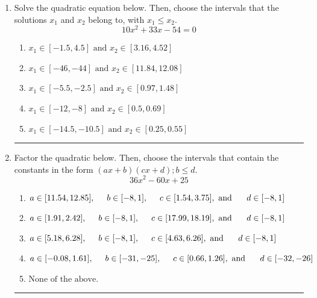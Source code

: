 \documentclass[14pt]{extbook}
\newcommand{\litem}[1]{\item#1\hspace*{-1cm}\rule{\textwidth}{0.4pt}}
\begin{document}
\begin{enumerate}
{\begin{enumerate}[label=\Alph*.]
\end{enumerate} }
\litem{
Solve the quadratic equation below. Then, choose the intervals that the solutions $x_1$ and $x_2$ belong to, with $x_1 \leq x_2$.\[ 10x^{2} +33 x -54 = 0 \]\begin{enumerate}[label=\Alph*.]
\item \( x_1 \in [-1.5, 4.5] \text{ and } x_2 \in [3.16, 4.52] \)
\item \( x_1 \in [-46, -44] \text{ and } x_2 \in [11.84, 12.08] \)
\item \( x_1 \in [-5.5, -2.5] \text{ and } x_2 \in [0.97, 1.48] \)
\item \( x_1 \in [-12, -8] \text{ and } x_2 \in [0.5, 0.69] \)
\item \( x_1 \in [-14.5, -10.5] \text{ and } x_2 \in [0.25, 0.55] \)

\end{enumerate} }
\litem{
Factor the quadratic below. Then, choose the intervals that contain the constants in the form $(ax+b)(cx+d); b \leq d.$\[ 36x^{2} -60 x + 25 \]\begin{enumerate}[label=\Alph*.]
\item \( a \in [11.54, 12.85], \hspace*{5mm} b \in [-8, 1], \hspace*{5mm} c \in [1.54, 3.75], \text{ and } \hspace*{5mm} d \in [-8, 1] \)
\item \( a \in [1.91, 2.42], \hspace*{5mm} b \in [-8, 1], \hspace*{5mm} c \in [17.99, 18.19], \text{ and } \hspace*{5mm} d \in [-8, 1] \)
\item \( a \in [5.18, 6.28], \hspace*{5mm} b \in [-8, 1], \hspace*{5mm} c \in [4.63, 6.26], \text{ and } \hspace*{5mm} d \in [-8, 1] \)
\item \( a \in [-0.08, 1.61], \hspace*{5mm} b \in [-31, -25], \hspace*{5mm} c \in [0.66, 1.26], \text{ and } \hspace*{5mm} d \in [-32, -26] \)
\item \( \text{None of the above.} \)


\end{enumerate}}
\end{enumerate}
\end{document}
